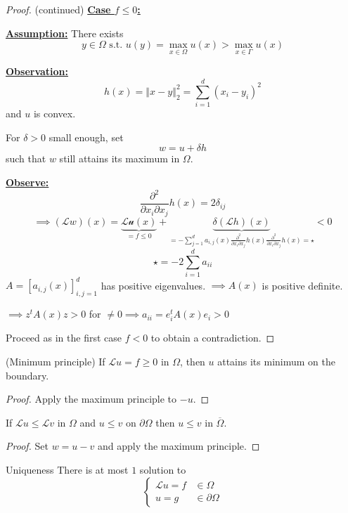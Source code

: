 

\begin{proof}(continued)
    \underline{\textbf{Case $f\leq 0$:}}
   
    \underline{\textbf{Assumption:}} There exists \[y\in \Omega \text{ s.t. }u(y)=\max_{x\in\Omega}u(x)>\max_{x\in \Gamma}u(x)\]

    \underline{\textbf{Observation:}} \[h(x)=\left\Vert x-y \right\Vert_2^2 = \sum_{i=1}^{d} (x_i-y_i)^2\]
    and $u$ is convex.

    For $\delta>0$ small enough, set \[w=u+\delta h\]
    such that $w$ still attains its maximum in $\Omega$.

    \underline{\textbf{Observe:}} 
    \[\frac{\partial^2}{\partial x_i \partial x_j} h(x)=2\delta_{ij}\]
    \[\implies (\mathcal{L}w)(x)=\underbrace{\mathcal{Lu}(x)}_{=f\leq 0}+\underbrace{\delta(\mathcal{L}h)(x)}_{=- \sum_{j=1}^d a_{i,j}(x)\frac{\partial^2}{\partial x_i \partial x_j} h(x)\frac{\partial^2}{\partial x_i \partial x_j} h(x)=\star}<0\]
    \[\star=-2\sum_{i=1}^{d} a_{ii}\]
    $A=[a_{i,j}(x)]_{i,j=1}^d$ has positive eigenvalues. $\implies A(x)$ is positive definite.

    $\implies z^t A(x)z>0$ for $\neq 0 \implies a_{ii}=e_i^t A(x)e_i>0$

    Proceed as in the first case $f<0$ to obtain a contradiction.
\end{proof}

\begin{corollary}(Minimum principle)
    If $\mathcal{L}u=f\geq 0$ in $\Omega$, then $u$ attains its minimum on the boundary.
\end{corollary}

\begin{proof}
    Apply the maximum principle to $-u$.
\end{proof}

\begin{corollary}
    If $\mathcal{L}u\leq \mathcal{L}v$ in $\Omega$ and $u\leq v$ on $\partial\Omega$ then $u\leq v$ in $\overline{\Omega}$.
\end{corollary}

\begin{proof}
    Set $w=u-v$ and apply the maximum principle.
\end{proof}

\begin{corollary}[]Uniqueness
    There is at most $1$ solution to \[\begin{cases}\mathcal{L}u=f & \in\Omega\\ u=g & \in \partial \Omega\end{cases} \] 
\end{corollary}

